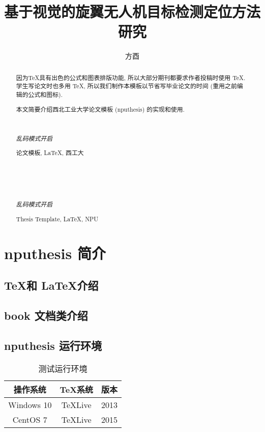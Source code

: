 \documentclass[twoside,UTF8]{nputhesis}
\title[Research on Vision-based Object Detection and Localization for Rotorcraft UAVs]{基于视觉的旋翼无人机目标检测定位方法研究}
\author[You Fang]{方酉}
\begin{document}
\makecover  %
\frontmatter

\begin{abstract}  
    因为\TeX 具有出色的公式和图表排版功能, 所以大部分期刊都要求作者投稿时使用
    \TeX. 学生写论文时也多用 \TeX, 所以我们制作本模板以节省写毕业论文的时间 
    (重用之前编辑的公式和图标).

    本文简要介绍西北工业大学论文模板 (nputhesis) 的实现和使用.

    { %
        \noindent\hrulefill\\
        {\centerline {\it 乱码模式开启}}
        \noindent\hrulefill
    }
    \begin{keywords}
        论文模板, \LaTeX, 西工大 
    \end{keywords}
\end{abstract}

\begin{Abstract}

    { %
        \noindent\hrulefill\\
        {\centerline {\it 乱码模式开启}}
        \noindent\hrulefill
    }
    \begin{Keywords}
        Thesis Template, \LaTeX, NPU
    \end{Keywords}
\end{Abstract}

\tableofcontents 

\mainmatter  %
\chapter{nputhesis 简介}
\section{\TeX 和 \LaTeX 介绍}
\section{book 文档类介绍}
\section{nputhesis 运行环境}

\begin{table}[h]
    \caption{测试运行环境}
    \centering
    \begin{tabular}{ccc}
        \toprule
        操作系统    & \TeX 系统   & 版本 \\
        \midrule
        Windows 10  & TeXLive     & 2013 \\
        CentOS 7    & TeXLive     & 2015 \\
        \bottomrule
    \end{tabular}
\end{table}
\end{document}
